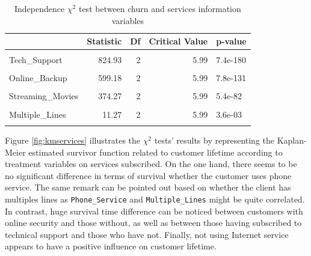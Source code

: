 \documentclass[
]{book}
\begin{document}
\begin{table}[H]

\caption{\label{tab:chi2services}Independence $\chi^2$ test between churn and services information variables}
\centering
\begin{tabular}[t]{lrrrl}
\toprule
  & Statistic & Df & Critical Value & p-value\\
\midrule
\cellcolor{gray!6}{Online\_Security} & \cellcolor{gray!6}{846.68} & \cellcolor{gray!6}{2} & \cellcolor{gray!6}{5.99} & \cellcolor{gray!6}{1.4e-184}\\
Tech\_Support & 824.93 & 2 & 5.99 & 7.4e-180\\
\cellcolor{gray!6}{Internet\_Service} & \cellcolor{gray!6}{728.70} & \cellcolor{gray!6}{2} & \cellcolor{gray!6}{5.99} & \cellcolor{gray!6}{5.8e-159}\\
Online\_Backup & 599.18 & 2 & 5.99 & 7.8e-131\\
\cellcolor{gray!6}{Device\_Protection} & \cellcolor{gray!6}{555.88} & \cellcolor{gray!6}{2} & \cellcolor{gray!6}{5.99} & \cellcolor{gray!6}{2e-121}\\
\addlinespace
Streaming\_Movies & 374.27 & 2 & 5.99 & 5.4e-82\\
\cellcolor{gray!6}{Streaming\_TV} & \cellcolor{gray!6}{372.46} & \cellcolor{gray!6}{2} & \cellcolor{gray!6}{5.99} & \cellcolor{gray!6}{1.3e-81}\\
Multiple\_Lines & 11.27 & 2 & 5.99 & 3.6e-03\\
\cellcolor{gray!6}{Phone\_Service} & \cellcolor{gray!6}{0.87} & \cellcolor{gray!6}{1} & \cellcolor{gray!6}{3.84} & \cellcolor{gray!6}{3.5e-01}\\
\bottomrule
\end{tabular}
\end{table}

Figure \ref{fig:kmservices} illustrates the \(\chi^2\) tests' results by representing the Kaplan-Meier estimated survivor function related to customer lifetime according to treatment variables on services subscribed. On the one hand, there seems to be no significant difference in terms of survival whether the customer uses phone service. The same remark can be pointed out based on whether the client has multiples lines as \texttt{Phone\_Service} and \texttt{Multiple\_Lines} might be quite correlated. In contrast, huge survival time difference can be noticed between customers with online security and those without, as well as between those having subscribed to technical support and those who have not. Finally, not using Internet service appears to have a positive influence on customer lifetime.
\end{document}
